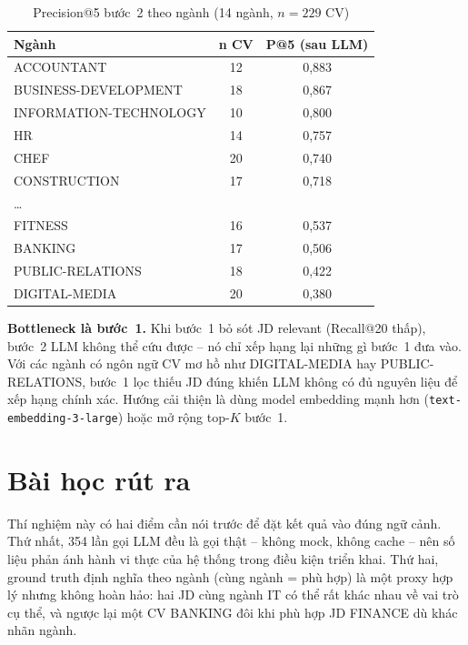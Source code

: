 \documentclass[../DoAn.tex]{subfiles}
\begin{document}
\begin{table}[H]
\centering
\caption{Precision@5 bước~2 theo ngành (14 ngành, $n=229$ CV)}
\label{tab:cat_p5}
\begin{tabular}{|l|c|c|}
\hline
\textbf{Ngành} & \textbf{n CV} & \textbf{P@5 (sau LLM)} \\ \hline
ACCOUNTANT             & 12 & 0{,}883 \\ \hline
BUSINESS-DEVELOPMENT   & 18 & 0{,}867 \\ \hline
INFORMATION-TECHNOLOGY & 10 & 0{,}800 \\ \hline
HR                     & 14 & 0{,}757 \\ \hline
CHEF                   & 20 & 0{,}740 \\ \hline
CONSTRUCTION           & 17 & 0{,}718 \\ \hline
\ldots & & \\ \hline
FITNESS                & 16 & 0{,}537 \\ \hline
BANKING                & 17 & 0{,}506 \\ \hline
PUBLIC-RELATIONS       & 18 & 0{,}422 \\ \hline
DIGITAL-MEDIA          & 20 & 0{,}380 \\ \hline
\end{tabular}
\end{table}

\textbf{Bottleneck là bước~1.} Khi bước~1 bỏ sót JD relevant (Recall@20 thấp), bước~2 LLM không thể cứu được -- nó chỉ xếp hạng lại những gì bước~1 đưa vào. Với các ngành có ngôn ngữ CV mơ hồ như DIGITAL-MEDIA hay PUBLIC-RELATIONS, bước~1 lọc thiếu JD đúng khiến LLM không có đủ nguyên liệu để xếp hạng chính xác. Hướng cải thiện là dùng model embedding mạnh hơn (\texttt{text-embedding-3-large}) hoặc mở rộng top-$K$ bước~1.

\section{Bài học rút ra}

Thí nghiệm này có hai điểm cần nói trước để đặt kết quả vào đúng ngữ cảnh.
Thứ nhất, 354 lần gọi LLM đều là gọi thật -- không mock, không cache -- nên
số liệu phản ánh hành vi thực của hệ thống trong điều kiện triển khai.
Thứ hai, ground truth định nghĩa theo ngành (cùng ngành = phù hợp) là một
proxy hợp lý nhưng không hoàn hảo: hai JD cùng ngành IT có thể rất khác nhau
về vai trò cụ thể, và ngược lại một CV BANKING đôi khi phù hợp JD FINANCE dù
khác nhãn ngành.
\end{document}
